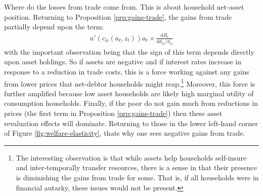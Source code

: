 \documentclass[12pt,pdftex]{article}
\begin{document}
\begin{onehalfspacing}
Where do the losses from trade come from. This is about household net-asset position. Returning to Proposition \ref{prp:gains-trade}, the gains from trade partially depend upon the term:
\begin{align}
u'(c_{ii}(a_{t},z_{t}))a_{t} \times \frac{\mathrm{d} R_{i}}{\mathrm{d} d_{ij} / d_{ij}}
\end{align}
with the important observation being that the sign of this term depends directly upon asset holdings. So if assets are negative and if interest rates increase in response to a reduction in trade costs, this is a force working against any gains from lower prices that net-debtor households might reap.\footnote{The interesting observation is that while assets help households self-insure and inter-temporally transfer resources, there is a sense in that their presence is diminishing the gains from trade for some. That is, if all households were in financial autarky, these issues would not be present.} Moreover, this force is further amplified because low asset households are likely high marginal utility of consumption households. Finally, if the poor do not gain much from reductions in prices (the first term in Proposition \ref{prp:gains-trade}) then these asset revaluation effects will dominate. Returning to those in the lower left-hand corner of Figure \ref{fig:welfare-elasticity}, thats why one sees negative gains from trade.


\end{onehalfspacing}
\end{document}
